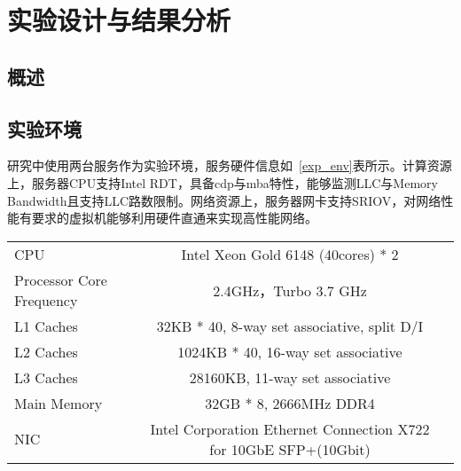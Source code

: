 \chapter{实验设计与结果分析}\label{chap:exp}

% 

\section{概述}

\section{实验环境}

研究中使用两台服务作为实验环境，服务硬件信息如~\ref{exp_env}表所示。计算资源上，服务器CPU支持Intel RDT，具备cdp与mba特性，能够监测LLC与Memory Bandwidth且支持LLC路数限制。网络资源上，服务器网卡支持SRIOV，对网络性能有要求的虚拟机能够利用硬件直通来实现高性能网络。

\begin{table}
    \label{tab:exp_env}
    \footnotesize%
    \setlength{\tabcolsep}{4pt}%
    \renewcommand{\arraystretch}{1.5}%
    \centering
    \begin{tabular}{lcc}
        \hline
        CPU & Intel Xeon Gold 6148 (40cores) * 2 \\
        Processor Core Frequency & 2.4GHz，Turbo 3.7 GHz \\
        L1 Caches & 32KB * 40,  8-way set associative, split D/I \\
        L2 Caches & 1024KB * 40, 16-way set associative \\
        L3 Caches & 28160KB, 11-way set associative \\
        Main Memory & 32GB * 8, 2666MHz DDR4 \\
        NIC & Intel Corporation Ethernet Connection X722 for 10GbE SFP+(10Gbit) \\
        \hline
    \end{tabular}
\end{table}

